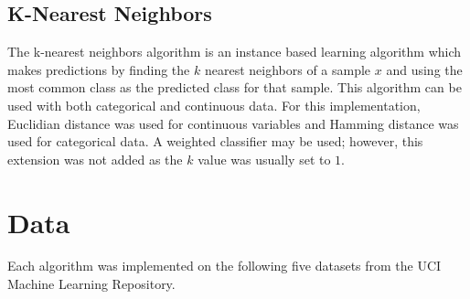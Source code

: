 \documentclass[11pt]{article}
\begin{document}
\subsection{K-Nearest Neighbors}
The k-nearest neighbors algorithm is an instance based learning algorithm which makes predictions by finding the $k$ nearest neighbors of a sample $x$ and using the most common class as the predicted class for that sample. This algorithm can be used with both categorical and continuous data. For this implementation, Euclidian distance was used for continuous variables and Hamming distance was used for categorical data. A weighted classifier may be used; however, this extension was not added as the $k$ value was usually set to $1$.

\section{Data}
Each algorithm was implemented on the following five datasets from the UCI Machine Learning Repository.
\end{document}
